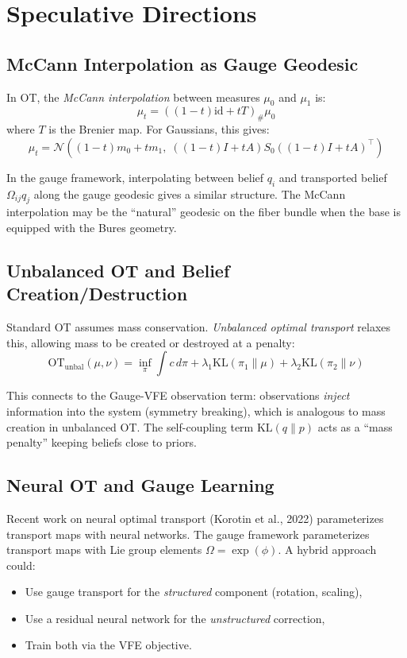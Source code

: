 \documentclass[11pt]{article}
\newcommand{\KL}{\mathrm{KL}}
\newcommand{\OT}{\mathrm{OT}}
\begin{document}
\section{Speculative Directions}

\subsection{McCann Interpolation as Gauge Geodesic}

In OT, the \emph{McCann interpolation} between measures $\mu_0$ and $\mu_1$ is:
\[
\mu_t = ((1-t)\text{id} + tT)_\#\mu_0
\]
where $T$ is the Brenier map. For Gaussians, this gives:
\[
\mu_t = \mathcal{N}((1-t)m_0 + tm_1,\; ((1-t)I + tA)S_0((1-t)I + tA)^\top)
\]

In the gauge framework, interpolating between belief $q_i$ and transported belief $\Omega_{ij}q_j$ along the gauge geodesic gives a similar structure. The McCann interpolation may be the ``natural'' geodesic on the fiber bundle when the base is equipped with the Bures geometry.

\subsection{Unbalanced OT and Belief Creation/Destruction}

Standard OT assumes mass conservation. \emph{Unbalanced optimal transport} relaxes this, allowing mass to be created or destroyed at a penalty:
\[
\OT_{\text{unbal}}(\mu,\nu) = \inf_\pi \int c\,d\pi + \lambda_1\KL(\pi_1\|\mu) + \lambda_2\KL(\pi_2\|\nu)
\]

This connects to the Gauge-VFE observation term: observations \emph{inject} information into the system (symmetry breaking), which is analogous to mass creation in unbalanced OT. The self-coupling term $\KL(q\|p)$ acts as a ``mass penalty'' keeping beliefs close to priors.

\subsection{Neural OT and Gauge Learning}

Recent work on neural optimal transport (Korotin et al., 2022) parameterizes transport maps with neural networks. The gauge framework parameterizes transport maps with Lie group elements $\Omega = \exp(\phi)$. A hybrid approach could:
\begin{itemize}
    \item Use gauge transport for the \emph{structured} component (rotation, scaling),
    \item Use a residual neural network for the \emph{unstructured} correction,
    \item Train both via the VFE objective.
\end{itemize}
\end{document}
